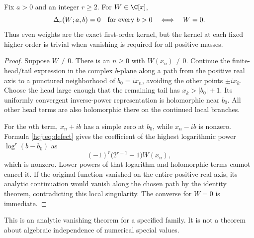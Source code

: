 \begin{theorem}\label{hqj:thm:rigidity}
Fix $a>0$ and an integer $r\ge2$. For $W\in\C[x]$,
\[
\Delta_r(W;a,b)=0\quad\hbox{for every }b>0
\quad\Longleftrightarrow\quad W=0.
\]
Thus even weights are the exact first-order kernel, but the kernel at
each fixed higher order is trivial when vanishing is required for all
positive masses.
\end{theorem}
\begin{proof}
Suppose $W\ne0$. There is an $n\ge0$ with $W(x_n)\ne0$. Continue the
finite-head/tail expression in the complex $b$-plane along a path from
the positive real axis to a punctured neighborhood of $b_0=ix_n$,
avoiding the other points $\pm ix_k$. Choose the head large enough that
the remaining tail has $x_k>|b_0|+1$. Its uniformly convergent
inverse-power representation is holomorphic near $b_0$. All other
head terms are also holomorphic there on the continued local branches.

For the $n$th term, $x_n+ib$ has a simple zero at $b_0$, while
$x_n-ib$ is nonzero. Formula \eqref{hqj:eq:defect} gives the coefficient
of the highest logarithmic power $\log^r(b-b_0)$ as
\[
(-1)^r\bigl(2^{r-1}-1\bigr)W(x_n),
\]
which is nonzero. Lower powers of that logarithm and holomorphic terms
cannot cancel it. If the original function vanished on the entire
positive real axis, its analytic continuation would vanish along the
chosen path by the identity theorem, contradicting this local
singularity. The converse for $W=0$ is immediate.
\end{proof}
This is an analytic vanishing theorem for a specified family. It is not
a theorem about algebraic independence of numerical special values.

